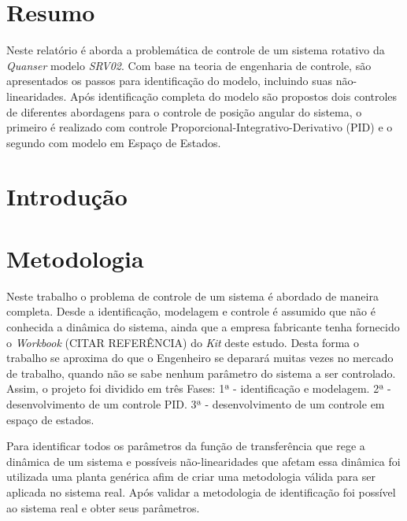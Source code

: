 \documentclass[a4paper,11pt]{article}
\author{Rafael Lima}
\begin{document}

\section{Resumo}

Neste relatório é aborda a problemática de controle de um sistema rotativo da \textit{Quanser} modelo \textit{SRV02}. Com base na teoria de engenharia de controle, são apresentados os passos para identificação do modelo, incluindo suas não-linearidades. Após identificação completa do modelo são propostos dois controles de diferentes abordagens para o controle de posição angular do sistema, o primeiro é realizado com controle Proporcional-Integrativo-Derivativo (PID) e o segundo com modelo em Espaço de Estados.

\section{Introdução}


\section{Metodologia}

Neste trabalho o problema de controle de um sistema é abordado de maneira completa. Desde a identificação, modelagem e controle é assumido que não é conhecida a dinâmica do sistema, ainda que a empresa fabricante tenha fornecido o \textit{Workbook} (CITAR REFERÊNCIA) do \textit{Kit} deste estudo. Desta forma o trabalho se aproxima do que o Engenheiro se deparará muitas vezes no mercado de trabalho, quando não se sabe nenhum parâmetro do sistema a ser controlado. Assim, o projeto foi dividido em três Fases: 1ª - identificação e modelagem. 2ª - desenvolvimento de um controle PID. 3ª - desenvolvimento de um controle em espaço de estados.

Para identificar todos os parâmetros da função de transferência que rege a dinâmica de um sistema e possíveis não-linearidades que afetam essa dinâmica foi utilizada uma planta genérica afim de criar uma metodologia válida para ser aplicada no sistema real. Após validar a metodologia de identificação foi possível ao sistema real e obter seus parâmetros.
\end{document}
